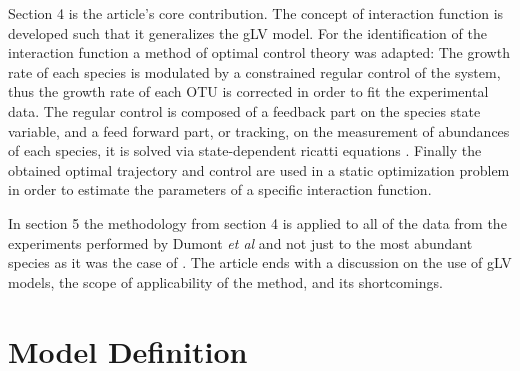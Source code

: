 \documentclass[3p,times]{elsarticle}
\begin{document}
Section 4 is the article's core contribution. The concept of interaction function is developed such that it generalizes the gLV model. For the identification of the interaction function a method of optimal control theory was adapted: The growth rate of each species is modulated by a constrained regular control of the system, thus the growth rate of each OTU is corrected in order to fit the experimental data. The regular control is composed of a feedback part on the species state variable, and a feed forward part, or tracking, on the measurement of abundances of each species, it is solved via state-dependent ricatti equations \cite{Cimen2008}. Finally the obtained optimal trajectory and control are used in a static optimization problem in order to estimate the parameters of a specific interaction function.

In section 5 the methodology from section 4 is applied to all of the data from the experiments performed by Dumont \textit{et al}\cite{Dumont2009} and not just to the most abundant species as it was the case of \cite{Dumont2016}. The article ends with a discussion on the use of gLV models, the scope of applicability of the method, and its shortcomings. 

\section{Model Definition}
\end{document}
